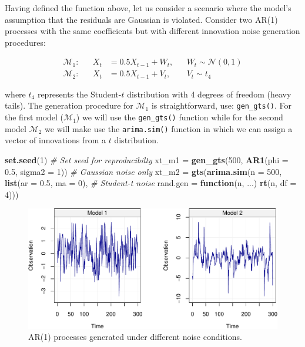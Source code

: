\documentclass[]{book}
\newenvironment{Shaded}{\begin{snugshade}}{\end{snugshade}}
\newcommand{\CommentTok}[1]{\textcolor[rgb]{0.56,0.35,0.01}{\textit{#1}}}
\newcommand{\ControlFlowTok}[1]{\textcolor[rgb]{0.13,0.29,0.53}{\textbf{#1}}}
\newcommand{\DataTypeTok}[1]{\textcolor[rgb]{0.13,0.29,0.53}{#1}}
\newcommand{\DecValTok}[1]{\textcolor[rgb]{0.00,0.00,0.81}{#1}}
\newcommand{\FloatTok}[1]{\textcolor[rgb]{0.00,0.00,0.81}{#1}}
\newcommand{\KeywordTok}[1]{\textcolor[rgb]{0.13,0.29,0.53}{\textbf{#1}}}
\newcommand{\NormalTok}[1]{#1}
\newcommand{\StringTok}[1]{\textcolor[rgb]{0.31,0.60,0.02}{#1}}
\theoremstyle{definition}
\theoremstyle{definition}
\theoremstyle{definition}
\theoremstyle{remark}
\begin{document}
Having defined the function above, let us consider a scenario where the
model's assumption that the residuals are Gaussian is violated. Consider
two AR(1) processes with the same coefficients but with different
innovation noise generation procedures:

\[
    \begin{aligned}
  \mathcal{M}_1:&{}& X_t &=0.5 X_{t-1} + W_t,&{}& W_t\sim \mathcal{N} (0,1) \\
  \mathcal{M}_2:&{}& X_t &=0.5 X_{t-1} + V_t,&{}& V_t\sim t_4
  \end{aligned}
\]

where \(t_4\) represents the Student-\(t\) distribution with 4 degrees
of freedom (heavy tails). The generation procedure for \(\mathcal{M}_1\)
is straightforward, use: \texttt{gen\_gts()}. For the first model
(\(\mathcal{M}_1\)) we will use the \texttt{gen\_gts()} function while
for the second model \(\mathcal{M}_2\) we will make use the
\texttt{arima.sim()} function in which we can assign a vector of
innovations from a \(t\) distribution.

\begin{Shaded}
\begin{Highlighting}[]
\KeywordTok{set.seed}\NormalTok{(}\DecValTok{1}\NormalTok{)                                        }\CommentTok{# Set seed for reproducibilty}
\NormalTok{xt_m1 =}\StringTok{ }\KeywordTok{gen_gts}\NormalTok{(}\DecValTok{500}\NormalTok{, }\KeywordTok{AR1}\NormalTok{(}\DataTypeTok{phi =} \FloatTok{0.5}\NormalTok{, }\DataTypeTok{sigma2 =} \DecValTok{1}\NormalTok{))   }\CommentTok{# Gaussian noise only}
\NormalTok{xt_m2 =}\StringTok{ }\KeywordTok{gts}\NormalTok{(}\KeywordTok{arima.sim}\NormalTok{(}\DataTypeTok{n =} \DecValTok{500}\NormalTok{, }\KeywordTok{list}\NormalTok{(}\DataTypeTok{ar =} \FloatTok{0.5}\NormalTok{, }\DataTypeTok{ma =} \DecValTok{0}\NormalTok{), }\CommentTok{# Student-t noise}
\DataTypeTok{rand.gen =} \ControlFlowTok{function}\NormalTok{(n, ...) }\KeywordTok{rt}\NormalTok{(n, }\DataTypeTok{df =} \DecValTok{4}\NormalTok{)))}
\end{Highlighting}
\end{Shaded}

\begin{figure}
\centering
\includegraphics{ts_files/figure-latex/mbbdatavis-1.pdf}
\caption{\label{fig:mbbdatavis}AR(1) processes generated under different
noise conditions.}
\end{figure}
\end{document}
